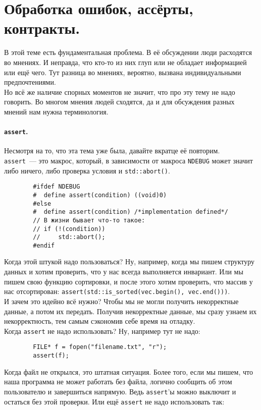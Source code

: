 \documentclass{article}
\begin{document}
    \section{Обработка ошибок, ассёрты, контракты.}
    В этой теме есть фундаментальная проблема. В её обсуждении люди расходятся во мнениях. И неправда, что кто-то из них глуп или не обладает информацией или ещё чего. Тут разница во мнениях, вероятно, вызвана индивидуальными предпочтениями.\\
    Но всё же наличие спорных моментов не значит, что про эту тему не надо говорить. Во многом мнения людей сходятся, да и для обсуждения разных мнений нам нужна терминология.
    \paragraph{\texttt{assert}.}
    Несмотря на то, что эта тема уже была, давайте вкратце её повторим.\\
    \texttt{assert}~--- это макрос, который, в зависимости от макроса \texttt{NDEBUG} может значит либо ничего, либо проверка условия и \texttt{std::abort()}.
    \begin{verbatim}
        #ifdef NDEBUG
        #  define assert(condition) ((void)0)
        #else
        #  define assert(condition) /*implementation defined*/
        // В жизни бывает что-то такое:
        // if (!(condition))
        //     std::abort();
        #endif
    \end{verbatim}
    Когда этой штукой надо пользоваться? Ну, например, когда мы пишем структуру данных и хотим проверить, что у нас всегда выполняется инвариант. Или мы пишем свою функцию сортировки, и после этого хотим проверить, что массив у нас отсортирован: \texttt{assert(std::is_sorted(vec.begin(), vec.end()))}.\\
    И зачем это идейно всё нужно? Чтобы мы не могли получить некорректные данные, а потом их передать. Получив некорректные данные, мы сразу узнаем их некорректность, тем самым сэкономив себе время на отладку.\\
    Когда \texttt{assert} не надо использовать? Ну, например тут не надо:
    \begin{verbatim}
        FILE* f = fopen("filename.txt", "r");
        assert(f);
    \end{verbatim}
    Когда файл не открылся, это штатная ситуация. Более того, если мы пишем, что наша программа не может работать без файла, логично сообщить об этом пользователю и завершиться напрямую. Ведь \texttt{assert}'ы можно выключит и остаться без этой проверки. Или ещё \texttt{assert} не надо использовать так:
\end{document}
